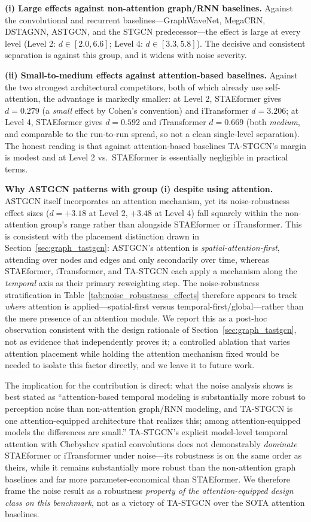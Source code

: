 \documentclass[a4paper,fleqn]{cas-sc}
\begin{document}
\textbf{(i) Large effects against non-attention graph/RNN baselines.} Against the convolutional and recurrent baselines---GraphWaveNet, MegaCRN, DSTAGNN, ASTGCN, and the STGCN predecessor---the effect is large at every level (Level 2: $d \in [2.0, 6.6]$; Level 4: $d \in [3.3, 5.8]$). The decisive and consistent separation is against this group, and it widens with noise severity.

\textbf{(ii) Small-to-medium effects against attention-based baselines.} Against the two strongest architectural competitors, both of which already use self-attention, the advantage is markedly smaller: at Level 2, STAEformer gives $d = 0.279$ (a \emph{small} effect by Cohen's convention) and iTransformer $d = 3.206$; at Level 4, STAEformer gives $d = 0.592$ and iTransformer $d = 0.669$ (both \emph{medium}, and comparable to the run-to-run spread, so not a clean single-level separation). The honest reading is that against attention-based baselines TA-STGCN's margin is modest and at Level 2 vs.\ STAEformer is essentially negligible in practical terms.

\textbf{Why ASTGCN patterns with group (i) despite using attention.} ASTGCN itself incorporates an attention mechanism, yet its noise-robustness effect sizes ($d = +3.18$ at Level 2, $+3.48$ at Level 4) fall squarely within the non-attention group's range rather than alongside STAEformer or iTransformer. This is consistent with the placement distinction drawn in Section~\ref{sec:graph_tastgcn}: ASTGCN's attention is \emph{spatial-attention-first}, attending over nodes and edges and only secondarily over time, whereas STAEformer, iTransformer, and TA-STGCN each apply a mechanism along the \emph{temporal} axis as their primary reweighting step. The noise-robustness stratification in Table~\ref{tab:noise_robustness_effects} therefore appears to track \emph{where} attention is applied---spatial-first versus temporal-first/global---rather than the mere presence of an attention module. We report this as a post-hoc observation consistent with the design rationale of Section~\ref{sec:graph_tastgcn}, not as evidence that independently proves it; a controlled ablation that varies attention placement while holding the attention mechanism fixed would be needed to isolate this factor directly, and we leave it to future work.

The implication for the contribution is direct: what the noise analysis shows is best stated as ``attention-based temporal modeling is substantially more robust to perception noise than non-attention graph/RNN modeling, and TA-STGCN is one attention-equipped architecture that realizes this; among attention-equipped models the differences are small.'' TA-STGCN's explicit model-level temporal attention with Chebyshev spatial convolutions does not demonstrably \emph{dominate} STAEformer or iTransformer under noise---its robustness is on the same order as theirs, while it remains substantially more robust than the non-attention graph baselines and far more parameter-economical than STAEformer. We therefore frame the noise result as a robustness \emph{property of the attention-equipped design class on this benchmark}, not as a victory of TA-STGCN over the SOTA attention baselines.
\end{document}
